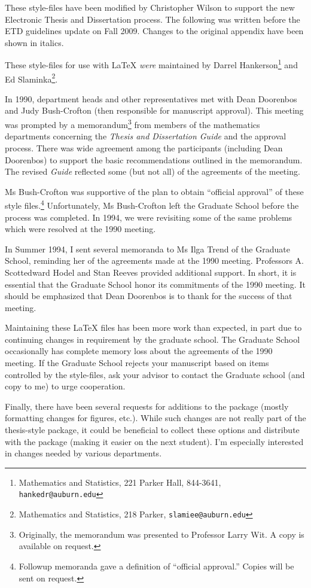 \documentclass{article}
\begin{document}
\begin{singlespace}
These style-files have been modified by Christopher Wilson to support the new Electronic Thesis and Dissertation process. The following was written before the ETD guidelines update on Fall 2009. Changes to the original appendix have been shown in italics. 

These style-files for use with \LaTeX{} {\it were} maintained by Darrel
Hankerson\footnote{Mathematics and Statistics, 221 Parker Hall,
844-3641, {\tt hankedr@auburn.edu}} and Ed
Slaminka\footnote{Mathematics and Statistics, 218 Parker,
{\tt slamiee@auburn.edu}}.

In 1990, department heads and other representatives met with Dean Doorenbos
and Judy Bush-Crofton (then responsible for manuscript approval). This
meeting was prompted by a memorandum\footnote{Originally, the memorandum
was presented to Professor Larry Wit. A copy is available on request.} from
members of the mathematics departments concerning the {\em Thesis and
Dissertation Guide\/} and the approval process. There was wide agreement
among the participants (including Dean Doorenbos) to support the basic
recommendations outlined in the memorandum. The revised {\em Guide\/}
reflected some (but not all) of the agreements of the meeting.

Ms Bush-Crofton was supportive of the plan to obtain ``official approval''
of these style files.\footnote{Followup memoranda gave a definition of
``official approval.'' Copies will be sent on request.}  Unfortunately, Ms
Bush-Crofton left the Graduate School before the process was completed. In
1994, we were revisiting some of the same problems which were
resolved at the 1990 meeting.

In Summer 1994, I sent several memoranda to Ms Ilga Trend of the Graduate
School, reminding her of the agreements made at the 1990 meeting.
Professors A. Scottedward Hodel and Stan Reeves provided additional
support.  In short, it is essential that the Graduate School honor its
commitments of the 1990 meeting. It should be emphasized that Dean
Doorenbos is to thank for the success of that meeting.

Maintaining these \LaTeX{} files has been more work than expected, in
part due to continuing changes in requirement by the graduate school.
The Graduate School occasionally has complete memory loss about the
agreements of the 1990 meeting. If the Graduate School rejects your
manuscript based on items controlled by the style-files, ask
your advisor to contact the Graduate school (and copy to me) to urge
cooperation.

Finally, there have been several requests for additions to the package
(mostly formatting changes for figures, etc.). While such changes are not
really part of the thesis-style package, it could be beneficial to collect
these options and distribute with the package (making it easier on the next
student).  I'm especially interested in changes needed by various
departments.

\end{singlespace}
\end{document}
